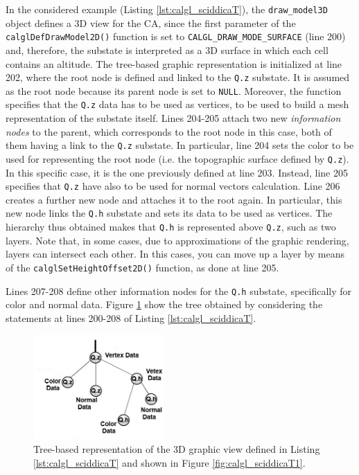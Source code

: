 In the considered example (Listing \ref{lst:calgl_sciddicaT}), the
\verb'draw_model3D' object defines a 3D view for the CA, since the
first parameter of the \verb'calglDefDrawModel2D()' function is set to
\verb'CALGL_DRAW_MODE_SURFACE' (line 200) and, therefore, the substate
is interpreted as a 3D surface in which each cell contains an
altitude. The tree-based graphic representation is initialized at line
202, where the root node is defined and linked to the \verb'Q.z'
substate. It is assumed as the root node because its parent node is
set to \verb'NULL'. Moreover, the function specifies that the \verb'Q.z'
data has to be used as vertices, to be used to build a mesh
representation of the substate itself. Lines 204-205 attach two new
\emph{information nodes} to the parent, which corresponds to the root
node in this case, both of them having a link to the \verb'Q.z'
substate. In particular, line 204 sets the color to be used for
representing the root node (i.e. the topographic surface defined by
\verb'Q.z'). In this specific case, it is the one previously defined
at line 203. Instead, line 205 specifies that \verb'Q.z' have also to
be used for normal vectors calculation. Line 206 creates a further new
node and attaches it to the root again. In particular, this new node
links the \verb'Q.h' substate and sets its data to be used as
vertices. The hierarchy thus obtained makes that \verb'Q.h' is
represented above \verb'Q.z', such as two layers. Note that, in some
cases, due to approximations of the graphic rendering, layers can
intersect each other. In this cases, you can move up a layer by means of
the \verb'calglSetHeightOffset2D()' function, as done at line 205.

Lines 207-208 define
other information nodes for the \verb'Q.h' substate, specifically for
color and normal data. Figure \ref{fig:opencal_gl_tree_example} show
the tree obtained by considering the statements at lines 200-208 of
Listing \ref{lst:calgl_sciddicaT}.

\begin{figure}
  \begin{center}
    \includegraphics[width=5cm]{./images/OpenCAL/calgl_sciddicaT_tree_model}
    \caption{Tree-based representation of the 3D graphic view defined
      in Listing \ref{lst:calgl_sciddicaT} and shown in Figure
      \ref{fig:calgl_sciddicaT1}.}
    \label{fig:opencal_gl_tree_example}
  \end{center}
\end{figure}

